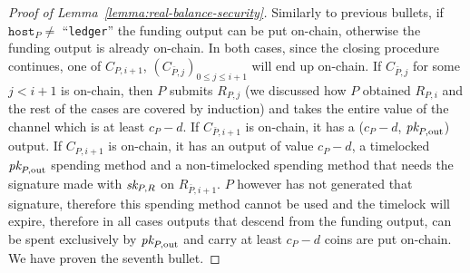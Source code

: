 \begin{proof}[Proof of Lemma~\ref{lemma:real-balance-security}]
  Similarly to previous bullets, if $\mathtt{host}_P \neq$ ``\texttt{ledger}'' the funding
  output can be put on-chain, otherwise the funding output is already on-chain.
  In both cases, since the closing procedure continues, one of $C_{P, i+1}$,
  $(C_{\bar{P}, j})_{0 \leq j \leq i+1}$ will end up on-chain. If $C_{\bar{P},
  j}$ for some $j < i+1$ is on-chain, then $P$ submits $R_{P, j}$ (we discussed
  how $P$ obtained $R_{P, i}$ and the rest of the cases are covered by
  induction) and takes the entire value of the channel which is at least $c_P -
  d$. If $C_{\bar{P}, i+1}$ is on-chain, it has a ($c_P - d$, $\textit{pk}_{P,
  \mathrm{out}}$) output. If $C_{P, i+1}$ is on-chain, it has an output of value
  $c_P - d$, a timelocked $\textit{pk}_{P, \mathrm{out}}$ spending method and a
  non-timelocked spending method that needs the signature made with $\textit{sk}_{P, R}$
  on $R_{\bar{P}, i+1}$. $P$ however has not generated that signature, therefore
  this spending method cannot be used and the timelock will expire, therefore in
  all cases outputs that descend from the funding output, can be spent
  exclusively by $\textit{pk}_{P, \mathrm{out}}$ and carry at least $c_P - d$ coins are
  put on-chain. We have proven the seventh bullet.


\end{proof}
